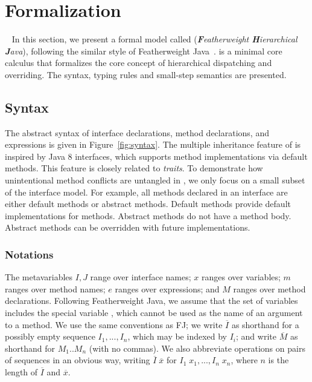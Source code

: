 \section{Formalization}~\label{sec:formalization}
In this section, we present a formal model called \MIM{} (\emph{\textbf{F}eatherweight \textbf{H}ierarchical \textbf{J}ava}), following the similar style of 
Featherweight Java~\cite{Igarashi01FJ}. \MIM{} is a minimal core calculus that formalizes the core concept of hierarchical dispatching and overriding. The syntax, typing rules and small-step semantics are presented.

\subsection{Syntax}
The abstract syntax of \MIM{} interface declarations, method declarations, and expressions is given in Figure~\ref{fig:syntax}. The multiple
inheritance feature of \MIM{} is inspired by Java 8 interfaces, which supports
method implementations via default methods. This feature is 
closely related to \emph{traits}. To demonstrate how
unintentional method conflicts are untangled in \MIM{}, we only focus on a small subset of the interface model. For example, all methods declared
in an interface are either default methods or abstract methods. Default methods provide default implementations for methods. Abstract methods do not
have a method body. Abstract methods can be overridden with future implementations.

\subsubsection{Notations}
The metavariables $I, J$ range over interface names; $x$ ranges over variables; $m$ ranges over method names; $e$ ranges over expressions; and $M$ ranges over method declarations. Following Featherweight Java, we assume that the set of variables includes the special variable \kwthis, which cannot be used as the name of an argument to a method. We use the same
conventions as FJ; we write $\overline{I}$ as shorthand for a possibly empty sequence $I_1, ..., I_n$, which may be indexed by $I_i$; and write $\overline{M}$ as shorthand for $M_1 .. M_n$ (with no commas). We also abbreviate operations on pairs of sequences in an obvious way, writing $\overline{I} \; \overline{x}$ for $I_1 \; x_1, ..., I_n \; x_n$, where $n$ is the length of $\overline{I}$ and $\overline{x}$.

